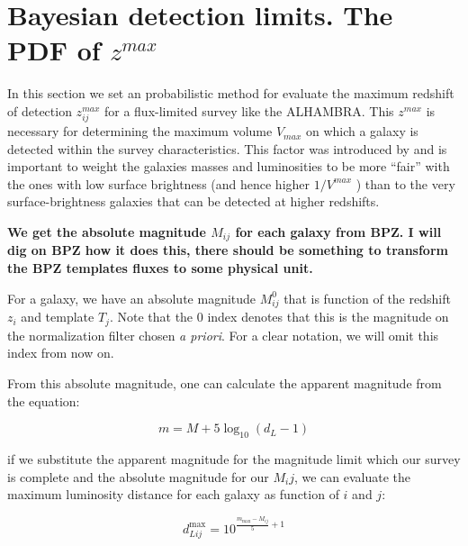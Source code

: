 \documentclass[a4paper, useAMS, usenatbib, hyperpdf]{mn2e}
\begin{document}
%

\section{Bayesian detection limits. The PDF of $z^{max}$}

In this section we set an probabilistic method for evaluate the maximum redshift of detection $z^{max}_{ij}$ for a flux-limited survey like the ALHAMBRA. This $z^{max}$ is necessary for determining the maximum volume $V_{max}$ on which a galaxy is detected within the survey characteristics. This factor was introduced by \cite{Schmidt.1968a} and is important to weight the galaxies masses and luminosities to be more ``fair'' with the ones with low surface brightness (and hence higher $1/V^{max}$ ) than to the very surface-brightness galaxies that can be detected at higher redshifts.

{\bf \color{red} We get the absolute magnitude $M_{ij}$ for each galaxy from BPZ. I will dig on BPZ how it does this, there should be something to transform the BPZ templates fluxes to some physical unit.}

For a galaxy, we have an absolute magnitude $M^0_{ij}$ that is function of the redshift $z_i$ and template $T_j$. Note that the $0$ index denotes that this is the magnitude on the normalization filter chosen {\it a priori}. For a clear notation, we will omit this index from now on.

 From this absolute magnitude, one can calculate the apparent magnitude from the equation:

\begin{equation}
m = M + 5 \log_{10} ( d_L - 1)
\end{equation}

\noindent if we substitute the apparent magnitude for the magnitude limit which our survey is complete and the absolute magnitude for our $M_ij$, we can evaluate the maximum luminosity distance for each galaxy as function of $i$ and $j$:

\begin{equation}
\label{eq:d_L}
d^{\textrm{max}}_{L ij} = 10 ^ {\frac{m_{\textrm{max}} - M_{ij}}{5} + 1}
\end{equation}
\end{document}
